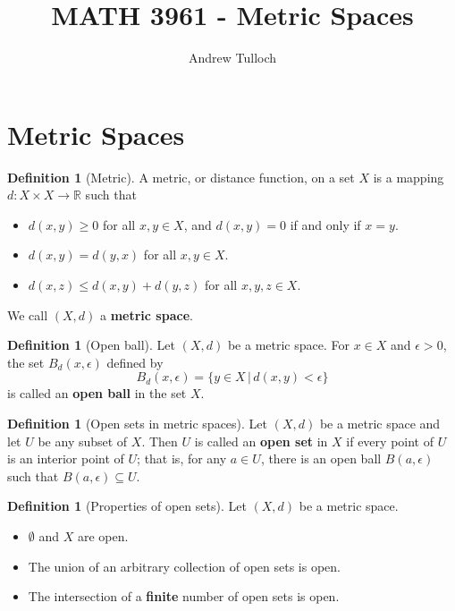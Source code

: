 \documentclass[10pt, oneside, reqno]{amsart}
\title{MATH 3961 - Metric Spaces}                               %
\author{Andrew Tulloch}
\theoremstyle{plain}%
\theoremstyle{definition}
\newtheorem{defn}[thm]{Definition}
\theoremstyle{remark}
\newcommand{\R}{\mathbb{R}}
\newcommand{\met}{(X,d)}
\begin{document}
\maketitle \tableofcontents \clearpage



\section{Metric Spaces} %
\label{sec:metric_spaces}

\begin{defn}[Metric]
    A metric, or distance function, on a set $X$ is a mapping $d : X \times X \rightarrow \R$ such that 
    \begin{itemize}
        \item $d(x,y) \geq 0$ for all $x,y \in X$, and $d(x,y) = 0$ if and only if $x = y$.
        \item $d(x,y) = d(y,x)$ for all $x,y \in X$.
        \item $d(x,z) \leq d(x,y) + d(y,z)$ for all $x,y,z \in X$.
    \end{itemize}
    
    We call $(X,d)$ a \textbf{metric space}.
\end{defn}

\begin{defn}[Open ball]
    Let $(X,d)$ be a metric space.  For $x \in X$ and $\epsilon > 0$, the set $B_d(x, \epsilon)$ defined by \[
        B_d(x,\epsilon) = \{ y \in X \, | \, d(x,y) < \epsilon \}
    \]
    is called an \textbf{open ball} in the set $X$.  
\end{defn}

\begin{defn}[Open sets in metric spaces]
    Let $(X,d)$ be a metric space and let $U$ be any subset of $X$.  Then $U$ is called an \textbf{open set} in $X$ if every point of $U$ is an interior point of $U$; that is, for any $a \in U$, there is an open ball $B(a, \epsilon)$ such that $B(a, \epsilon) \subseteq U$.
\end{defn}

\begin{defn}[Properties of open sets]
    Let $\met$ be a metric space.
    \begin{itemize}
        \item $\emptyset$ and $X$ are open.
        \item The union of an arbitrary collection of open sets is open.
        \item The intersection of a \textbf{finite} number of open sets is open.
    \end{itemize}
\end{defn}
\end{document}
